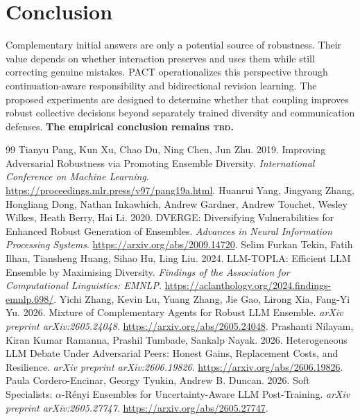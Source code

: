 \documentclass[10pt,twocolumn]{article}
\newcommand{\method}{\textsc{PACT}}
\newcommand{\TBD}{\textsc{tbd}}
\begin{document}
\section{Conclusion}
Complementary initial answers are only a potential source of robustness. Their value depends on whether interaction preserves and uses them while still correcting genuine mistakes. \method{} operationalizes this perspective through continuation-aware responsibility and bidirectional revision learning. The proposed experiments are designed to determine whether that coupling improves robust collective decisions beyond separately trained diversity and communication defenses. \textbf{The empirical conclusion remains \TBD{}.}

\clearpage
\begingroup\footnotesize
\setlength{\bibsep}{3pt}
\begin{thebibliography}{99}
Tianyu Pang, Kun Xu, Chao Du, Ning Chen, Jun Zhu. 2019. Improving Adversarial Robustness via Promoting Ensemble Diversity. \emph{International Conference on Machine Learning}. \url{https://proceedings.mlr.press/v97/pang19a.html}.
Huanrui Yang, Jingyang Zhang, Hongliang Dong, Nathan Inkawhich, Andrew Gardner, Andrew Touchet, Wesley Wilkes, Heath Berry, Hai Li. 2020. DVERGE: Diversifying Vulnerabilities for Enhanced Robust Generation of Ensembles. \emph{Advances in Neural Information Processing Systems}. \url{https://arxiv.org/abs/2009.14720}.
Selim Furkan Tekin, Fatih Ilhan, Tiansheng Huang, Sihao Hu, Ling Liu. 2024. LLM-TOPLA: Efficient LLM Ensemble by Maximising Diversity. \emph{Findings of the Association for Computational Linguistics: EMNLP}. \url{https://aclanthology.org/2024.findings-emnlp.698/}.
Yichi Zhang, Kevin Lu, Yuang Zhang, Jie Gao, Lirong Xia, Fang-Yi Yu. 2026. Mixture of Complementary Agents for Robust LLM Ensemble. \emph{arXiv preprint arXiv:2605.24048}. \url{https://arxiv.org/abs/2605.24048}.
Prashanti Nilayam, Kiran Kumar Ramanna, Prashil Tumbade, Sankalp Nayak. 2026. Heterogeneous LLM Debate Under Adversarial Peers: Honest Gains, Replacement Costs, and Resilience. \emph{arXiv preprint arXiv:2606.19826}. \url{https://arxiv.org/abs/2606.19826}.
Paula Cordero-Encinar, Georgy Tyukin, Andrew B. Duncan. 2026. Soft Specialists: $\alpha$-R\'{e}nyi Ensembles for Uncertainty-Aware LLM Post-Training. \emph{arXiv preprint arXiv:2605.27747}. \url{https://arxiv.org/abs/2605.27747}.

\end{thebibliography}
\end{document}
